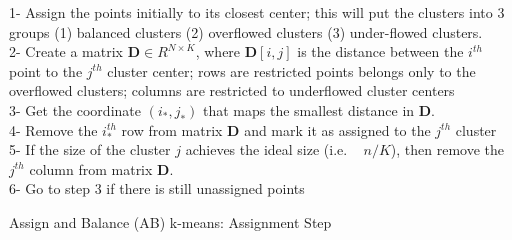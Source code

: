 \begin{algorithm}[t!]
1- Assign the points initially to its closest center; this will put the clusters into 3 groups (1) balanced clusters   (2) overflowed clusters (3) under-flowed clusters.\\
2- Create a matrix $\textbf{D} \in R^{N \times K}$, where $\textbf{D}[i,j]$ is the distance between the $i^{th}$ point to the $j^{th}$ cluster center; rows are restricted points belongs only to the overflowed clusters; columns are restricted to underflowed cluster centers \\
3- Get the coordinate $(i_*,j_*)$ that maps the smallest distance in $\textbf{D}$.\\
4- Remove the $i_*^{th}$ row from matrix $\textbf{D}$ and mark it as assigned to the $j^{th}$ cluster\\
5- If the size of the cluster $j$ achieves the ideal size (i.e. ~ $n/K$), then remove the $j^{th}$ column from matrix $\textbf{D}$.\\
6- Go to step 3 if there is still unassigned points
\caption{Assign and Balance (AB) k-means: Assignment Step}
\label{alg:ddclusterALg1}
\end{algorithm}









